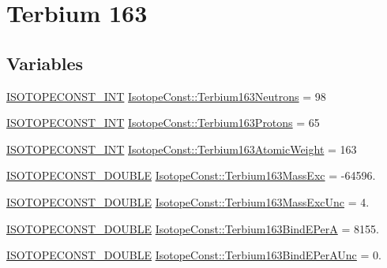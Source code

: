 \hypertarget{group___isotope_const-_terbium-_tb163}{}\section{Terbium 163}
\label{group___isotope_const-_terbium-_tb163}
\subsection*{Variables}
\begin{DoxyCompactItemize}
\item 
\mbox{\hyperlink{group___isotope_const-_macros_ga5f18360b3e99483a35c32d789e62621c}{I\+S\+O\+T\+O\+P\+E\+C\+O\+N\+S\+T\+\_\+\+I\+NT}} \mbox{\hyperlink{group___isotope_const-_terbium-_tb163_gaa2e69ce6299542ccc92d228b9a7b79af}{Isotope\+Const\+::\+Terbium163\+Neutrons}} = 98
\item 
\mbox{\hyperlink{group___isotope_const-_macros_ga5f18360b3e99483a35c32d789e62621c}{I\+S\+O\+T\+O\+P\+E\+C\+O\+N\+S\+T\+\_\+\+I\+NT}} \mbox{\hyperlink{group___isotope_const-_terbium-_tb163_gaf55845c00f04eb651138c9bc7459757a}{Isotope\+Const\+::\+Terbium163\+Protons}} = 65
\item 
\mbox{\hyperlink{group___isotope_const-_macros_ga5f18360b3e99483a35c32d789e62621c}{I\+S\+O\+T\+O\+P\+E\+C\+O\+N\+S\+T\+\_\+\+I\+NT}} \mbox{\hyperlink{group___isotope_const-_terbium-_tb163_gaccbcab308eeb534b984125aaff58ea1b}{Isotope\+Const\+::\+Terbium163\+Atomic\+Weight}} = 163
\item 
\mbox{\hyperlink{group___isotope_const-_macros_ga8f45a7272ce02c0b4c65c44636ed719a}{I\+S\+O\+T\+O\+P\+E\+C\+O\+N\+S\+T\+\_\+\+D\+O\+U\+B\+LE}} \mbox{\hyperlink{group___isotope_const-_terbium-_tb163_ga5c2b6fe20c89794241251247e965d3cb}{Isotope\+Const\+::\+Terbium163\+Mass\+Exc}} = -\/64596.
\item 
\mbox{\hyperlink{group___isotope_const-_macros_ga8f45a7272ce02c0b4c65c44636ed719a}{I\+S\+O\+T\+O\+P\+E\+C\+O\+N\+S\+T\+\_\+\+D\+O\+U\+B\+LE}} \mbox{\hyperlink{group___isotope_const-_terbium-_tb163_ga2c8bc09eeef172e6537160c13174adf1}{Isotope\+Const\+::\+Terbium163\+Mass\+Exc\+Unc}} = 4.
\item 
\mbox{\hyperlink{group___isotope_const-_macros_ga8f45a7272ce02c0b4c65c44636ed719a}{I\+S\+O\+T\+O\+P\+E\+C\+O\+N\+S\+T\+\_\+\+D\+O\+U\+B\+LE}} \mbox{\hyperlink{group___isotope_const-_terbium-_tb163_ga4ca59b4e7c4ae5e43aeb5fe38ff2a930}{Isotope\+Const\+::\+Terbium163\+Bind\+E\+PerA}} = 8155.
\item 
\mbox{\hyperlink{group___isotope_const-_macros_ga8f45a7272ce02c0b4c65c44636ed719a}{I\+S\+O\+T\+O\+P\+E\+C\+O\+N\+S\+T\+\_\+\+D\+O\+U\+B\+LE}} \mbox{\hyperlink{group___isotope_const-_terbium-_tb163_gac9e6e597b0baa75751ce64e10a65945d}{Isotope\+Const\+::\+Terbium163\+Bind\+E\+Per\+A\+Unc}} = 0.

\end{DoxyCompactItemize}
